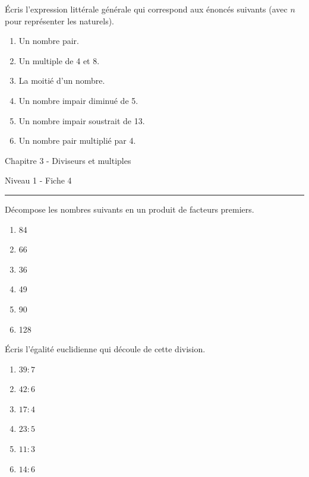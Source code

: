 \documentclass[12pt,parskip=half-, twoside=semi]{scrartcl}
\begin{document}
    \begin{exercise}
        Écris l'expression littérale générale qui correspond aux énoncés suivants (avec \(n\) pour représenter les naturels).
        \begin{enumerate}[cols=2]
            \item Un nombre pair.
            \item Un multiple de 4 et 8.
            \item La moitié d'un nombre. 
            \item Un nombre impair diminué de 5.
            \item Un nombre impair soustrait de 13.
            \item Un nombre pair multiplié par 4.
        \end{enumerate}
      \end{exercise}


\newpage


\begin{center}
\bfseries
\begin{Huge}
Chapitre 3 - Diviseurs et multiples
\end{Huge}
\smallbreak
\begin{large}
Niveau 1  - Fiche 4
\end{large}
\smallbreak
\rule[10pt]{.5\linewidth}{1 pt}
\end{center}

\setcounter{exercise}{0}
    
    \begin{exercise}
      Décompose les nombres suivants en un produit de facteurs premiers.

      \begin{enumerate}[cols=3]
          \item 84
          \item 66
          \item 36
          \item 49
          \item 90
          \item 128
      \end{enumerate}
    \end{exercise}
    
    \begin{exercise}
      Écris l'égalité euclidienne qui découle de cette
    division.
      \begin{enumerate}[cols=3]
        \item $39 : 7$
        \item $42 : 6$
        \item $17 : 4$
        \item $23 : 5$
        \item $11 : 3$
        \item $14 : 6$
      \end{enumerate}
    \end{exercise}
    
\end{document}
